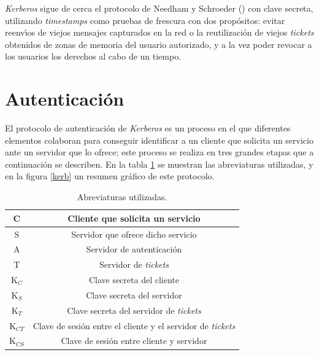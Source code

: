 {\it Kerberos} sigue de cerca el protocolo de Needham y Schroeder
(\cite{kn:nee78}) con clave
secreta, utilizando {\it timestamps} como pruebas de frescura con dos
prop\'ositos: evitar reenv\'{\i}os de viejos mensajes capturados en la red o la
reutilizaci\'on de viejos {\it tickets} obtenidos de zonas de memoria del
usuario autorizado, y a la vez poder revocar a los usuarios los derechos al
cabo de un tiempo.
\section{Autenticaci\'on}
El protocolo de autenticaci\'on de {\it Kerberos} es un proceso en el que
diferentes elementos colaboran para conseguir identificar a un cliente que 
solicita un servicio ante un servidor que lo ofrece; este proceso se
realiza en tres grandes etapas que a continuaci\'on se describen. En la tabla 
\ref{kerb-abbr} se muestran las abreviaturas utilizadas, y en la figura 
\ref{kerb} un resumen gr\'afico de este protocolo.
\begin{table}
\begin{center}
\begin{tabular}{|c||c|}
\hline
C & Cliente que solicita un servicio\\
\hline
S & Servidor que ofrece dicho servicio\\
\hline
A & Servidor de autenticaci\'on\\
\hline
T & Servidor de {\it tickets}\\
\hline
K$_{C}$ & Clave secreta del cliente\\
\hline
K$_{S}$ & Clave secreta del servidor\\
\hline
K$_{T}$ & Clave secreta del servidor de {\it tickets}\\
\hline
K$_{CT}$ & Clave de sesi\'on entre el cliente y el servidor de {\it tickets}\\
\hline
K$_{CS}$ & Clave de sesi\'on entre cliente y servidor\\
\hline
\end{tabular}
\caption{Abreviaturas utilizadas.}
\label{kerb-abbr}
\end{center}
\end{table}
